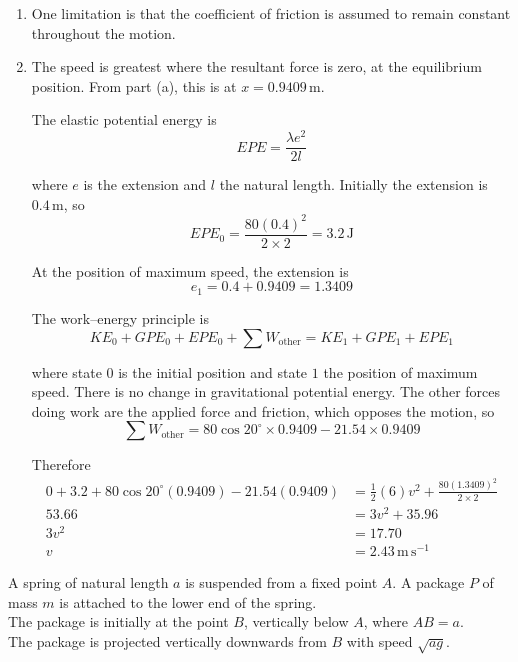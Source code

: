 \documentclass[leqno]{article}
\begin{document}
\begin{enumerate}[
  label=\textbf{\arabic*.},
  leftmargin=*,
  topsep=0pt,
  partopsep=0pt,
  parsep=0pt
]
\begin{djsSolution}
\begin{enumerate}[label=\textbf{(\alph*)}, start=1]
  \item One limitation is that the coefficient of friction is assumed to remain constant throughout the motion.

  \item The speed is greatest where the resultant force is zero, at the equilibrium position. From part (a), this is at \(x=0.9409\,\mathrm{m}\).

  The elastic potential energy is
  \[
  EPE=\frac{\lambda e^2}{2l}
  \]

  where \(e\) is the extension and \(l\) the natural length. Initially the extension is \(0.4\,\mathrm{m}\), so
  \[
  EPE_0=\frac{80(0.4)^2}{2\times 2}=3.2\,\mathrm{J}
  \]

  At the position of maximum speed, the extension is
  \[
  e_1=0.4+0.9409=1.3409
  \]

  The work--energy principle is
  \[
  KE_0+GPE_0+EPE_0+\sum W_{\text{other}}=KE_1+GPE_1+EPE_1
  \]

  where state \(0\) is the initial position and state \(1\) the position of maximum speed. There is no change in gravitational potential energy. The other forces doing work are the applied force and friction, which opposes the motion, so
  \[
  \sum W_{\text{other}}=80\cos 20^\circ\times 0.9409-21.54\times 0.9409
  \]

  Therefore
  \begin{align*}
  0+3.2+80\cos 20^\circ(0.9409)-21.54(0.9409)
  &=\frac12(6)v^2+\frac{80(1.3409)^2}{2\times 2}\\
  53.66&=3v^2+35.96\\
  3v^2&=17.70\\
  v&=2.43\,\mathrm{m\,s^{-1}}
  \end{align*}
\end{enumerate}
\end{djsSolution}


\newpage

\questionitem

A spring of natural length $a$ is suspended from a fixed point $A$. A package $P$ of mass $m$ is attached to the lower end of the spring. \\

The package is initially at the point $B$, vertically below $A$, where $AB=a$. \\

The package is projected vertically downwards from $B$ with speed $\sqrt{ag}$. \\


\end{enumerate}
\end{document}
